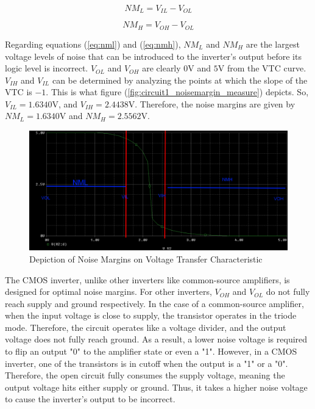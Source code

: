 \begin{equation}
	\label{eq:nml}
	NM_{L} = V_{IL} - V_{OL}
\end{equation}

\begin{equation}
	\label{eq:nmh}
	NM_{H} = V_{OH} - V_{OL}
\end{equation}

Regarding equations (\ref{eq:nml}) and (\ref{eq:nmh}), $NM_{L}$ and $NM_{H}$ are the largest voltage levels of noise that can be introduced to the inverter's output before its logic level is incorrect. $V_{OL}$ and $V_{OH}$ are clearly $0$\si{\volt} and $5$\si{\volt} from the VTC curve. $V_{IH}$ and $V_{IL}$ can be determined by analyzing the points at which the slope of the VTC is $-1$. This is what figure (\ref{fig:circuit1_noisemargin_measure}) depicts. So, $V_{IL} = 1.6340$\si{\volt}, and $V_{IH} = 2.4438$\si{\volt}. Therefore, the noise margins are given by $NM_{L} = 1.6340$\si{\volt} and $NM_{H} = 2.5562$\si{\volt}. \\

\FloatBarrier

\begin{figure}[h!]
	\centering
	\includegraphics[scale=0.75]{../images/circuit1_noisemargin.PNG}
	\caption{Depiction of Noise Margins on Voltage Transfer Characteristic}
	\label{fig:circuit1_noisemargin}
\end{figure}

\FloatBarrier

The CMOS inverter, unlike other inverters like common-source amplifiers, is designed for optimal noise margins. For other inverters, $V_{OH}$ and $V_{OL}$ do not fully reach supply and ground respectively. In the case of a common-source amplifier, when the input voltage is close to supply, the transistor operates in the triode mode. Therefore, the circuit operates like a voltage divider, and the output voltage does not fully reach ground. As a result, a lower noise voltage is required to flip an output "0" to the amplifier state or even a "1". However, in a CMOS inverter, one of the transistors is in cutoff when the output is a "1" or a "0". Therefore, the open circuit fully consumes the supply voltage, meaning the output voltage hits either supply or ground. Thus, it takes a higher noise voltage to cause the inverter's output to be incorrect. \\

